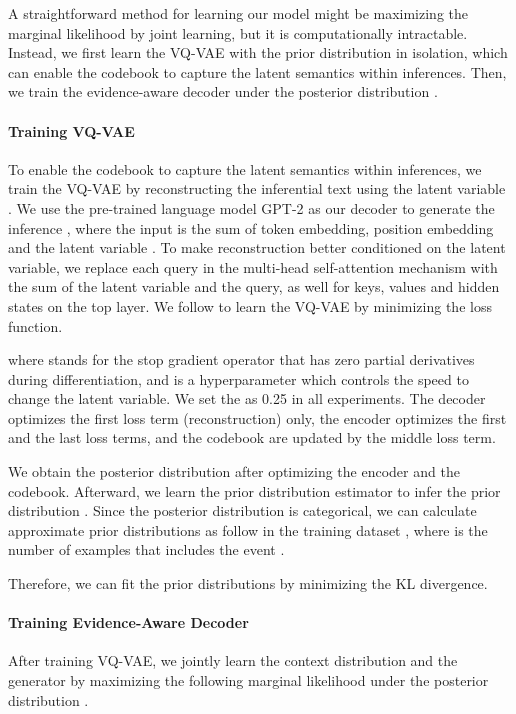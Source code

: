 \documentclass[11pt,a4paper]{article}
\begin{document}
A straightforward method for learning our model might be maximizing the marginal likelihood by joint learning, but it is computationally intractable. 
Instead, we first learn the VQ-VAE with the prior distribution  in isolation, which can enable the codebook to capture the latent semantics within inferences. Then, we train the evidence-aware decoder under the posterior distribution .




\paragraph{Training VQ-VAE}
To enable the codebook to capture the latent semantics within inferences, we train the VQ-VAE by reconstructing the inferential text  using the latent variable .  We use the pre-trained language model GPT-2 \cite{radford2019language} as our decoder to generate the inference , where the input is the sum of token embedding, position embedding and the latent variable . To make reconstruction better conditioned on the latent variable, we replace each query in the multi-head self-attention mechanism with the sum of the latent variable and the query, as well for keys, values and hidden states on the top layer. We follow \citet{van2017neural} to learn the VQ-VAE by minimizing the loss function. 

where  stands for the stop gradient operator that has zero partial derivatives during differentiation, and  is a hyperparameter which controls the speed to change the latent variable. We set the  as 0.25 in all experiments. The decoder optimizes the first loss term (reconstruction) only, the encoder optimizes the first and the last loss terms, and the codebook are updated by the middle loss term.

We obtain the posterior distribution  after optimizing the encoder and the codebook. Afterward, we learn the prior distribution estimator to infer the prior distribution . 
Since the posterior distribution is categorical, we can calculate approximate prior distributions as follow in the training dataset , where  is the number of examples that includes the event . 


Therefore, we can fit the prior distributions by minimizing the KL divergence.





\paragraph{Training Evidence-Aware Decoder}
After training VQ-VAE, we jointly learn the context distribution  and the generator  by maximizing the following marginal likelihood under the posterior distribution .
\end{document}
